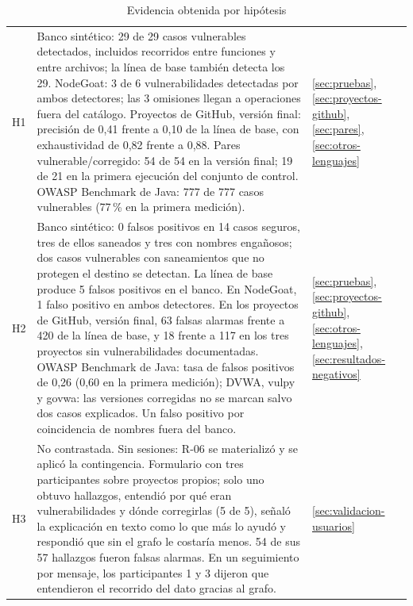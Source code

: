 \begin{table}[H]
    \centering
    \caption{Evidencia obtenida por hipótesis}
    \label{tab:evidencia-hipotesis}
    \small
    \begin{tabularx}{\textwidth}{l L L}
        \toprule
         &  &  \\
        \midrule
        H1 & Banco sintético: 29 de 29 casos vulnerables detectados, incluidos recorridos entre funciones y entre archivos; la línea de base también detecta los 29. NodeGoat: 3 de 6 vulnerabilidades detectadas por ambos detectores; las 3 omisiones llegan a operaciones fuera del catálogo. Proyectos de GitHub, versión final: precisión de 0,41 frente a 0,10 de la línea de base, con exhaustividad de 0,82 frente a 0,88. Pares vulnerable/corregido: 54 de 54 en la versión final; 19 de 21 en la primera ejecución del conjunto de control. OWASP Benchmark de Java: 777 de 777 casos vulnerables (77\,\% en la primera medición). & \ref{sec:pruebas}, \ref{sec:proyectos-github}, \ref{sec:pares}, \ref{sec:otros-lenguajes} \\
        H2 & Banco sintético: 0 falsos positivos en 14 casos seguros, tres de ellos saneados y tres con nombres engañosos; dos casos vulnerables con saneamientos que no protegen el destino se detectan. La línea de base produce 5 falsos positivos en el banco. En NodeGoat, 1 falso positivo en ambos detectores. En los proyectos de GitHub, versión final, 63 falsas alarmas frente a 420 de la línea de base, y 18 frente a 117 en los tres proyectos sin vulnerabilidades documentadas. OWASP Benchmark de Java: tasa de falsos positivos de 0,26 (0,60 en la primera medición); DVWA, vulpy y govwa: las versiones corregidas no se marcan salvo dos casos explicados. Un falso positivo por coincidencia de nombres fuera del banco. & \ref{sec:pruebas}, \ref{sec:proyectos-github}, \ref{sec:otros-lenguajes}, \ref{sec:resultados-negativos} \\
        H3 & No contrastada. Sin sesiones: R-06 se materializó y se aplicó la contingencia. Formulario con tres participantes sobre proyectos propios; solo uno obtuvo hallazgos, entendió por qué eran vulnerabilidades y dónde corregirlas (5 de 5), señaló la explicación en texto como lo que más lo ayudó y respondió que sin el grafo le costaría menos. 54 de sus 57 hallazgos fueron falsas alarmas. En un seguimiento por mensaje, los participantes 1 y 3 dijeron que entendieron el recorrido del dato gracias al grafo. & \ref{sec:validacion-usuarios} \\
        \bottomrule
    \end{tabularx}
\end{table}
